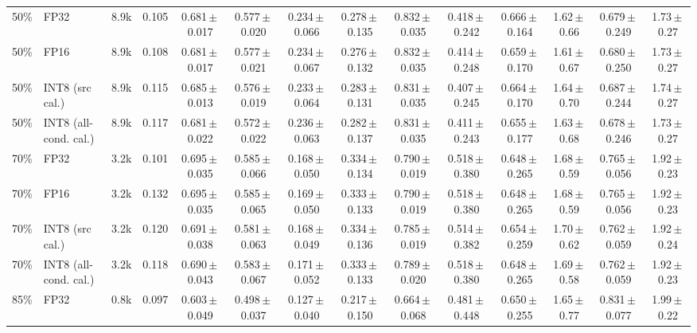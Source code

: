 \begin{tabular}{rl r r cccccccccc}
50\% & FP32 & 8.9k & 0.105 & 0.681\,$\pm$\,0.017 & 0.577\,$\pm$\,0.020 & 0.234\,$\pm$\,0.066 & 0.278\,$\pm$\,0.135 & 0.832\,$\pm$\,0.035 & 0.418\,$\pm$\,0.242 & 0.666\,$\pm$\,0.164 & 1.62\,$\pm$\,0.66 & 0.679\,$\pm$\,0.249 & 1.73\,$\pm$\,0.27 \\
50\% & FP16 & 8.9k & 0.108 & 0.681\,$\pm$\,0.017 & 0.577\,$\pm$\,0.021 & 0.234\,$\pm$\,0.067 & 0.276\,$\pm$\,0.132 & 0.832\,$\pm$\,0.035 & 0.414\,$\pm$\,0.248 & 0.659\,$\pm$\,0.170 & 1.61\,$\pm$\,0.67 & 0.680\,$\pm$\,0.250 & 1.73\,$\pm$\,0.27 \\
50\% & INT8 (src cal.) & 8.9k & 0.115 & 0.685\,$\pm$\,0.013 & 0.576\,$\pm$\,0.019 & 0.233\,$\pm$\,0.064 & 0.283\,$\pm$\,0.131 & 0.831\,$\pm$\,0.035 & 0.407\,$\pm$\,0.245 & 0.664\,$\pm$\,0.170 & 1.64\,$\pm$\,0.70 & 0.687\,$\pm$\,0.244 & 1.74\,$\pm$\,0.27 \\
50\% & INT8 (all-cond. cal.) & 8.9k & 0.117 & 0.681\,$\pm$\,0.022 & 0.572\,$\pm$\,0.022 & 0.236\,$\pm$\,0.063 & 0.282\,$\pm$\,0.137 & 0.831\,$\pm$\,0.035 & 0.411\,$\pm$\,0.243 & 0.655\,$\pm$\,0.177 & 1.63\,$\pm$\,0.68 & 0.678\,$\pm$\,0.246 & 1.73\,$\pm$\,0.27 \\
70\% & FP32 & 3.2k & 0.101 & 0.695\,$\pm$\,0.035 & 0.585\,$\pm$\,0.066 & 0.168\,$\pm$\,0.050 & 0.334\,$\pm$\,0.134 & 0.790\,$\pm$\,0.019 & 0.518\,$\pm$\,0.380 & 0.648\,$\pm$\,0.265 & 1.68\,$\pm$\,0.59 & 0.765\,$\pm$\,0.056 & 1.92\,$\pm$\,0.23 \\
70\% & FP16 & 3.2k & 0.132 & 0.695\,$\pm$\,0.035 & 0.585\,$\pm$\,0.065 & 0.169\,$\pm$\,0.050 & 0.333\,$\pm$\,0.133 & 0.790\,$\pm$\,0.019 & 0.518\,$\pm$\,0.380 & 0.648\,$\pm$\,0.265 & 1.68\,$\pm$\,0.59 & 0.765\,$\pm$\,0.056 & 1.92\,$\pm$\,0.23 \\
70\% & INT8 (src cal.) & 3.2k & 0.120 & 0.691\,$\pm$\,0.038 & 0.581\,$\pm$\,0.063 & 0.168\,$\pm$\,0.049 & 0.334\,$\pm$\,0.136 & 0.785\,$\pm$\,0.019 & 0.514\,$\pm$\,0.382 & 0.654\,$\pm$\,0.259 & 1.70\,$\pm$\,0.62 & 0.762\,$\pm$\,0.059 & 1.92\,$\pm$\,0.24 \\
70\% & INT8 (all-cond. cal.) & 3.2k & 0.118 & 0.690\,$\pm$\,0.043 & 0.583\,$\pm$\,0.067 & 0.171\,$\pm$\,0.052 & 0.333\,$\pm$\,0.133 & 0.789\,$\pm$\,0.020 & 0.518\,$\pm$\,0.380 & 0.648\,$\pm$\,0.265 & 1.69\,$\pm$\,0.58 & 0.762\,$\pm$\,0.059 & 1.92\,$\pm$\,0.23 \\
85\% & FP32 & 0.8k & 0.097 & 0.603\,$\pm$\,0.049 & 0.498\,$\pm$\,0.037 & 0.127\,$\pm$\,0.040 & 0.217\,$\pm$\,0.150 & 0.664\,$\pm$\,0.068 & 0.481\,$\pm$\,0.448 & 0.650\,$\pm$\,0.255 & 1.65\,$\pm$\,0.77 & 0.831\,$\pm$\,0.077 & 1.99\,$\pm$\,0.22 \\

\end{tabular}
